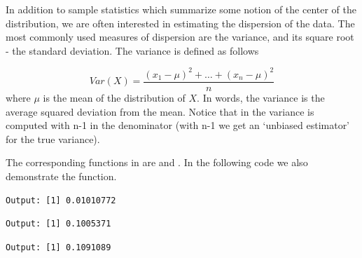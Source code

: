 In addition to sample statistics which summarize some notion of the center of the distribution, we are often interested in estimating the dispersion of the data. The most commonly used measures of dispersion are the variance, and its square root - the standard deviation. The variance is defined as follows

$$Var(X)=\frac{(x_1-\mu)^2+\ldots+(x_n-\mu)^2}{n}$$
 where $\mu$ is the mean of the distribution of $X$. In words, the variance is the average squared deviation from the mean.
Notice that in \R the variance is computed with n-1 in the denominator (with n-1 we get an `unbiased estimator' for the true variance).

The corresponding functions in \R are  and . In the following code we also demonstrate the  function.
\begin{knitrout}
\color{fgcolor}\begin{kframe}
\begin{alltt}
\end{alltt}
\begin{verbatim}
Output: [1] 0.01010772
\end{verbatim}
\begin{alltt}
 
\end{alltt}
\begin{verbatim}
Output: [1] 0.1005371
\end{verbatim}
\begin{alltt}
\end{alltt}
\begin{verbatim}
Output: [1] 0.1091089
\end{verbatim}
\end{kframe}
\end{knitrout}


